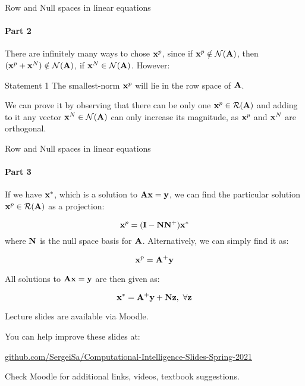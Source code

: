\documentclass{beamer}
\begin{document}
\begin{frame}{Row and Null spaces in linear equations}
\framesubtitle{Part 2}
\begin{flushleft}

There are infinitely many ways to chose $\mathbf{x}^p$, since if $\mathbf{x}^p \notin \mathcal{N}(\mathbf{A})$, then $(\mathbf{x}^p + \mathbf{x}^N) \notin \mathcal{N}(\mathbf{A})$, if $\mathbf{x}^N \in \mathcal{N}(\mathbf{A})$. However: 

\begin{block}{Statement 1}
The smallest-norm $\mathbf{x}^p$ will lie in the row space of $\mathbf{A}$.
\end{block}

\bigskip

We can prove it by observing that there can be only one $\mathbf{x}^p \in \mathcal{R}(\mathbf{A})$ and adding to it any vector $\mathbf{x}^N \in \mathcal{N}(\mathbf{A})$ can only increase its magnitude, as $\mathbf{x}^p$ and $\mathbf{x}^N$ are orthogonal.

\end{flushleft}
\end{frame}



\begin{frame}{Row and Null spaces in linear equations}
\framesubtitle{Part 3}
\begin{flushleft}

If we have $\mathbf{x}^*$, which is a solution to $\mathbf{A} \mathbf{x} = \mathbf{y}$, we can find the particular solution $\mathbf{x}^p \in \mathcal{R}(\mathbf{A})$ as a projection:

\begin{equation}
    \mathbf{x}^p = (\mathbf{I} - \mathbf{N} \mathbf{N}^+) \mathbf{x}^*
\end{equation}
%
where $\mathbf{N}$ is the null space basis for $\mathbf{A}$. Alternatively, we can simply find it as:

\begin{equation}
    \mathbf{x}^p = \mathbf{A}^+ \mathbf{y}
\end{equation}

\bigskip

All solutions to $\mathbf{A} \mathbf{x} = \mathbf{y}$ are then given as:

\begin{equation}
    \mathbf{x}^* = \mathbf{A}^+ \mathbf{y} + \mathbf{N}\mathbf{z}, \ \forall \mathbf{z}
\end{equation}

\end{flushleft}
\end{frame}




\begin{frame}
\centerline{Lecture slides are available via Moodle.}
\bigskip
\centerline{You can help improve these slides at:}
\centerline{
\textcolor{blue}{\href{https://github.com/SergeiSa/Computational-Intelligence-Slides-Spring-2021}{github.com/SergeiSa/Computational-Intelligence-Slides-Spring-2021}}
}
\bigskip

\textcolor{black}{}
\bigskip


\centerline{Check Moodle for additional links, videos, textbook suggestions.}
\end{frame}
\end{document}
